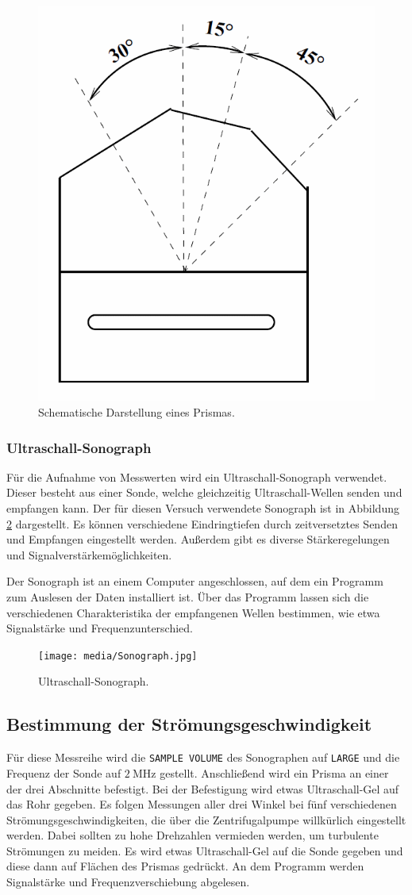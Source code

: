 \begin{figure}
    \centering
    \includegraphics[width=.35\textwidth]{media/prisma.png}
    \caption{Schematische Darstellung eines Prismas. \cite{Versuchsanleitung}}
    \label{fig:prisma}
\end{figure}

\subsubsection{Ultraschall-Sonograph}
Für die Aufnahme von Messwerten wird ein Ultraschall-Sonograph verwendet. Dieser besteht aus einer Sonde, welche gleichzeitig Ultraschall-Wellen senden und empfangen kann.
Der für diesen Versuch verwendete Sonograph ist in Abbildung \ref{fig:sono} dargestellt.
Es können verschiedene Eindringtiefen durch zeitversetztes Senden und Empfangen eingestellt werden. Außerdem gibt es diverse Stärkeregelungen und Signalverstärkemöglichkeiten.

Der Sonograph ist an einem Computer angeschlossen, auf dem ein Programm zum Auslesen der Daten installiert ist. Über das Programm lassen sich die verschiedenen Charakteristika
der empfangenen Wellen bestimmen, wie etwa Signalstärke und Frequenzunterschied.

\begin{figure}
    \centering
    \texttt{[image: media/Sonograph.jpg]}
    \caption{Ultraschall-Sonograph.}
    \label{fig:sono}
\end{figure}

\subsection{Bestimmung der Strömungsgeschwindigkeit}
Für diese Messreihe wird die \texttt{SAMPLE VOLUME} des Sonographen auf \texttt{LARGE} und die Frequenz der Sonde auf $\SI{2}{\mega\hertz}$ gestellt.
Anschließend wird ein Prisma an einer der drei Abschnitte befestigt. Bei der Befestigung wird etwas Ultraschall-Gel auf das Rohr gegeben.
Es folgen Messungen aller drei Winkel bei fünf verschiedenen Strömungsgeschwindigkeiten, die über die Zentrifugalpumpe willkürlich eingestellt werden.
Dabei sollten zu hohe Drehzahlen vermieden werden, um turbulente Strömungen zu meiden.
Es wird etwas Ultraschall-Gel auf die Sonde gegeben und diese dann auf Flächen des Prismas gedrückt. An dem Programm werden Signalstärke und Frequenzverschiebung abgelesen.

